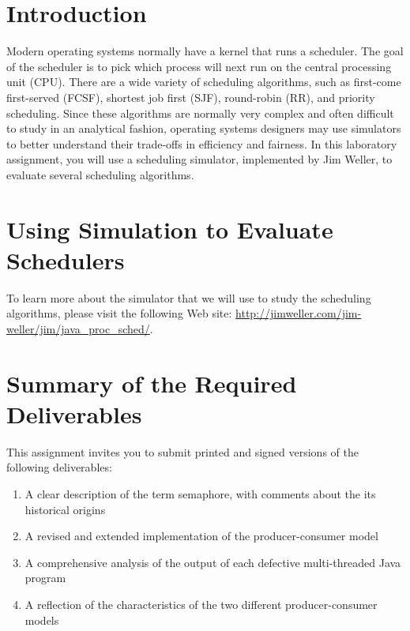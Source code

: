 


\usepackage[compact]{titlesec}


\section*{Introduction}

  Modern operating systems normally have a kernel that runs a scheduler.  The goal of the scheduler is to pick which
  process will next run on the central processing unit (CPU).  There are a wide variety of scheduling algorithms, such
  as first-come first-served (FCSF), shortest job first (SJF), round-robin (RR), and priority scheduling.  Since these
  algorithms are normally very complex and often difficult to study in an analytical fashion, operating systems
  designers may use simulators to better understand their trade-offs in efficiency and fairness. In this laboratory
  assignment, you will use a scheduling simulator, implemented by Jim Weller, to evaluate several scheduling algorithms.

\section*{Using Simulation to Evaluate Schedulers}

  To learn more about the simulator that we will use to study the scheduling algorithms, please visit the following Web
  site: \url{http://jimweller.com/jim-weller/jim/java_proc_sched/}.

\section*{Summary of the Required Deliverables}

This assignment invites you to submit printed and signed versions of the following deliverables: 

\begin{enumerate}

  \item A clear description of the term semaphore, with comments about the its historical origins 

  \item A revised and extended implementation of the producer-consumer model

  \item A comprehensive analysis of the output of each defective multi-threaded Java program

  \item A reflection of the characteristics of the two different producer-consumer models

\end{enumerate}

